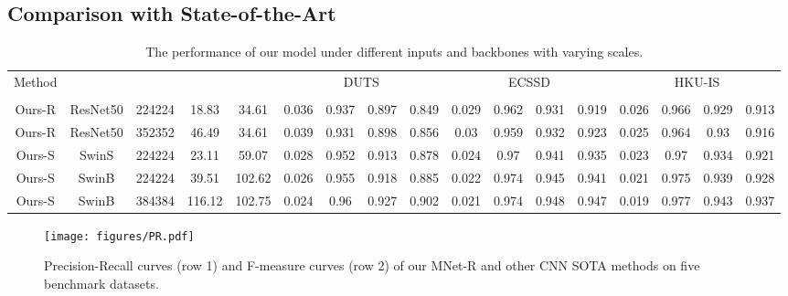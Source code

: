 \documentclass[lettersize,journal]{IEEEtran}
\begin{document}
\subsection{Comparison with State-of-the-Art}
\begin{table*}
	\centering
	\scriptsize
	\caption{The performance of our model under different inputs and backbones with varying scales. }
	\label{tab:size}
	\setlength\tabcolsep{1.5mm}
	\begin{tabular}{c|c|c|c|c|cccc|cccc|cccc}\hline
		\multirow{2}{*}{Method} & {\multirow{2}{*}{Backbone}} & {\multirow{2}{*}{Input Size}} & {\multirow{2}{*}{MACs}} & {\multirow{2}{*}{Params}} & \multicolumn{4}{c|}{DUTS} & \multicolumn{4}{c|}{ECSSD} & \multicolumn{4}{c}{HKU-IS}\\
		
		& &&&&  &  &  &  &  &  &  &  &  &  &  &  \\
		\hline Ours-R & ResNet50 & 224224 & 18.83 & 34.61 & 0.036 & {0.937} & {0.897} & {0.849} & {0.029} & {0.962} & {0.931} & {0.919} & {0.026} & {0.966} & {0.929} & {0.913} \\
		Ours-R & ResNet50 & 352352 & 46.49 & 34.61 & 0.039 & 0.931 & 0.898 & 0.856 & 0.03 & 0.959 & 0.932 & 0.923 & 0.025 & 0.964 & 0.93 & 0.916\\
		Ours-S & SwinS & 224224 & 23.11 & 59.07 & 0.028 & 0.952 & 0.913 & 0.878 & 0.024 & 0.97 & 0.941 & 0.935 & 0.023 & 0.97 & 0.934 & 0.921\\
		Ours-S & SwinB & 224224 & 39.51 & 102.62 & 0.026 & 0.955 & 0.918 & 0.885 & 0.022 & 0.974 & 0.945 & 0.941 & 0.021 & 0.975 & 0.939 & 0.928\\
		Ours-S & SwinB & 384384 & 116.12 & 102.75 & {0.024} & {0.96} & {0.927} & {0.902} & {0.021} & {0.974} & {0.948} & {0.947} & {0.019} & {0.977} & {0.943} & {0.937} \\
		\hline 
	\end{tabular}
	\vspace{-3mm}
\end{table*}
\begin{figure*}[ht]
	\centering \texttt{[image: figures/PR.pdf]}
	\caption{Precision-Recall curves (row 1) and F-measure curves (row 2) of our MNet-R and other CNN SOTA methods on five benchmark datasets. }
	\label{fig:PR&Fm}
\end{figure*}
\end{document}
